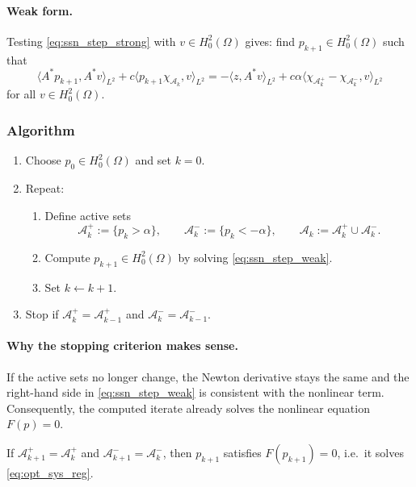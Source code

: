 \documentclass[11pt,a4paper]{article}
\begin{document}
\paragraph{Weak form.}
Testing \eqref{eq:ssn_step_strong} with $v\in H_0^2(\Omega)$ gives:
find $p_{k+1}\in H_0^2(\Omega)$ such that
\begin{equation}\label{eq:ssn_step_weak}
\langle A^\ast p_{k+1},A^\ast v\rangle_{L^2}
+
c\langle p_{k+1}\chi_{\mathcal{A}_k},v\rangle_{L^2}
=
-\langle z, A^\ast v\rangle_{L^2}
+
c\alpha\langle \chi_{\mathcal{A}_k^+}-\chi_{\mathcal{A}_k^-},v\rangle_{L^2}
\end{equation}
for all $v\in H_0^2(\Omega)$.

\subsubsection{Algorithm}

\begin{algorithm}\label{alg:ssn_paper}
\begin{enumerate}
\item Choose $p_0\in H_0^2(\Omega)$ and set $k=0$.
\item Repeat:
\begin{enumerate}
\item[(i)] Define active sets
\[
\mathcal{A}_k^+ := \{p_k>\alpha\},\qquad \mathcal{A}_k^- := \{p_k<-\alpha\},\qquad \mathcal{A}_k:=\mathcal{A}_k^+\cup \mathcal{A}_k^-.
\]
\item[(ii)] Compute $p_{k+1}\in H_0^2(\Omega)$ by solving \eqref{eq:ssn_step_weak}.
\item[(iii)] Set $k\leftarrow k+1$.
\end{enumerate}
\item Stop if $\mathcal{A}_k^+=\mathcal{A}_{k-1}^+$ and $\mathcal{A}_k^-=\mathcal{A}_{k-1}^-$.
\end{enumerate}
\end{algorithm}

\paragraph{Why the stopping criterion makes sense.}
If the active sets no longer change, the Newton derivative stays the same and the right-hand side in \eqref{eq:ssn_step_weak} is consistent with the nonlinear term.
Consequently, the computed iterate already solves the nonlinear equation $F(p)=0$.

\begin{proposition}\label{prop:active_set_stop}
If $\mathcal{A}_{k+1}^+=\mathcal{A}_k^+$ and $\mathcal{A}_{k+1}^-=\mathcal{A}_k^-$, then $p_{k+1}$ satisfies $F(p_{k+1})=0$, i.e.\ it solves \eqref{eq:opt_sys_reg}.
\end{proposition}
\end{document}
